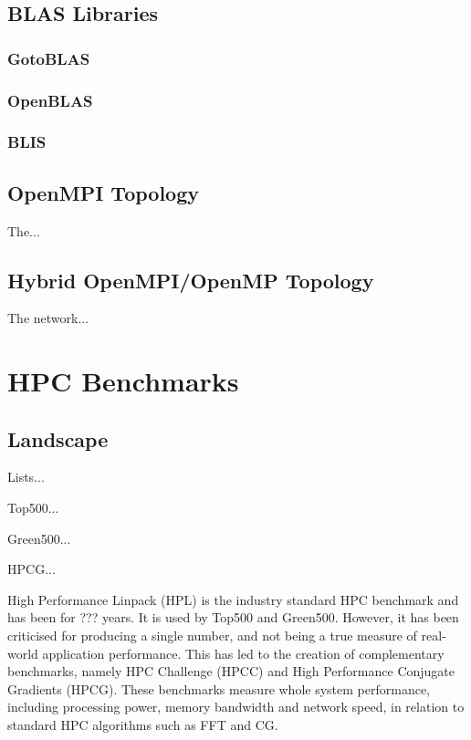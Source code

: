 \documentclass{report}
\begin{document}
\section{BLAS Libraries}

\subsection{GotoBLAS}

\subsection{OpenBLAS}

\subsection{BLIS}


%
%
\section{OpenMPI Topology}

The...


%
%
\section{Hybrid OpenMPI/OpenMP Topology}

The network...



%
%
\chapter{HPC Benchmarks}

\section{Landscape}

Lists... 

Top500...

Green500...

HPCG...


High Performance Linpack (HPL) is the industry standard HPC benchmark and has been for ??? years. It is used by Top500 and Green500. However, it has been criticised for producing a single number, and not being a true measure of real-world application performance. This has led to the creation of complementary benchmarks, namely HPC Challenge (HPCC) and High Performance Conjugate Gradients (HPCG). These benchmarks measure whole system performance, including processing power, memory bandwidth and network speed, in relation to standard HPC algorithms such as FFT and CG.
\end{document}
